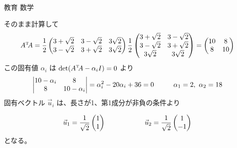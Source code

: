 \documentclass[fleqn]{jbook}
\begin{document}
\begin{answer}{教育 数学}{}
\begin{subanswers}
\begin{subsubanswers}
  \SubSubAnswer
    そのまま計算して
%
    \[ \Trans{A}A = \frac{1}{2}\begin{pmatrix}%
      3+\sqrt{2} &3-\sqrt{2} &3\sqrt{2}  \\
      3-\sqrt{2} &3+\sqrt{2} &3\sqrt{2}  
     \end{pmatrix}%
     \frac{1}{2}\begin{pmatrix}%
      3+\sqrt{2} &3-\sqrt{2}  \\
      3-\sqrt{2} &3+\sqrt{2}  \\
      3\sqrt{2}  &3\sqrt{2}   
     \end{pmatrix}%
     = \begin{pmatrix} 10 & 8 \\ 8 & 10 \end{pmatrix} \]
%
     この固有値 $\alpha_i$ は ${\rm det}(\Trans{A}A-\alpha_i I)=0$ より
%
     \[ \left| \begin{matrix}%
      10-\alpha_i & 8 \\
      8 & 10 - \alpha_i
     \end{matrix} \right|%
     = \alpha_i^2 - 20\alpha_i + 36 = 0 %
     \hspace{10mm} \alpha_1 = 2,\,\,\alpha_2 = 18 \]
%
     固有ベクトル $\vec{u}_i$ は、長さが1、第1成分が非負の条件より

     \[ \vec{u}_1 = \frac{1}{\sqrt{2}}%
        \begin{pmatrix} 1 \\  1 \end{pmatrix} \hspace{20mm}%
        \vec{u}_2 = \frac{1}{\sqrt{2}}%
        \begin{pmatrix} 1 \\ -1 \end{pmatrix} \]
%
    となる。



\end{subsubanswers}
\end{subanswers}
\end{answer}
\end{document}

